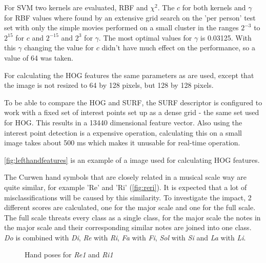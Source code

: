 For SVM two kernels are evaluated, RBF and $\chi^2$. The $c$ for both kernels and $\gamma$ for RBF values where found by an extensive grid search on the 'per person' test set with only the simple movies performed on a small cluster in the ranges $2^{-3}$ to $2^{15}$ for $c$ and $2^{-15}$ and $2^3$ for $\gamma$. The most optimal values for $\gamma$ is 0.03125. With this $\gamma$ changing the value for $c$ didn't have much effect on the performance, so a value of 64 was taken.

For calculating the HOG features the same parameters as \citep{watanabe2009} are used, except that the image is not resized to 64 by 128 pixels, but 128 by 128 pixels.

To be able to compare the HOG and SURF, the SURF descriptor is configured to work with a fixed set of interest points set up as a dense grid - the same set used for HOG. This results in a 13440 dimensional feature vector. Also using the interest point detection is a expensive operation, calculating this on a small image takes about 500 ms which makes it unusable for real-time operation.

\autoref{fig:lefthandfeatures} is an example of a image used for calculating HOG features.


The Curwen hand symbols that are closely related in a musical scale way are quite similar, for example 'Re' and 'Ri' (\autoref{fig:reri}). It is expected that a lot of misclassifications will be caused by this similarity. To investigate the impact, 2 different scores are calculated, one for the major scale and one for the full scale. The full scale threats every class as a single class, for the major scale the notes in the major scale and their corresponding similar notes are joined into one class. \emph{Do} is combined with \emph{Di}, \emph{Re} with \emph{Ri}, \emph{Fa} with \emph{Fi}, \emph{Sol} with \emph{Si} and \emph{La} with \emph{Li}.


\begin{figure}[htbp]
  \centering
{}
\hspace{0.03\linewidth}
  \caption{Hand poses for \emph{Re1} and \emph{Ri1}}
  \label{fig:reri}
\end{figure}


